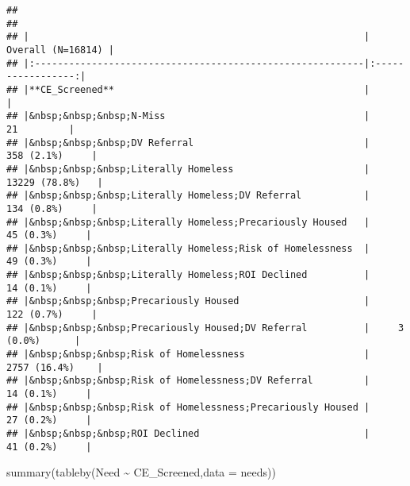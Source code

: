 \documentclass[
]{article}
\newenvironment{Shaded}{\begin{snugshade}}{\end{snugshade}}
\newcommand{\AttributeTok}[1]{\textcolor[rgb]{0.77,0.63,0.00}{#1}}
\newcommand{\FunctionTok}[1]{\textcolor[rgb]{0.00,0.00,0.00}{#1}}
\newcommand{\NormalTok}[1]{#1}
\newcommand{\SpecialCharTok}[1]{\textcolor[rgb]{0.00,0.00,0.00}{#1}}
\begin{document}
\begin{verbatim}
## 
## 
## |                                                           | Overall (N=16814) |
## |:----------------------------------------------------------|:-----------------:|
## |**CE_Screened**                                            |                   |
## |&nbsp;&nbsp;&nbsp;N-Miss                                   |        21         |
## |&nbsp;&nbsp;&nbsp;DV Referral                              |    358 (2.1%)     |
## |&nbsp;&nbsp;&nbsp;Literally Homeless                       |   13229 (78.8%)   |
## |&nbsp;&nbsp;&nbsp;Literally Homeless;DV Referral           |    134 (0.8%)     |
## |&nbsp;&nbsp;&nbsp;Literally Homeless;Precariously Housed   |     45 (0.3%)     |
## |&nbsp;&nbsp;&nbsp;Literally Homeless;Risk of Homelessness  |     49 (0.3%)     |
## |&nbsp;&nbsp;&nbsp;Literally Homeless;ROI Declined          |     14 (0.1%)     |
## |&nbsp;&nbsp;&nbsp;Precariously Housed                      |    122 (0.7%)     |
## |&nbsp;&nbsp;&nbsp;Precariously Housed;DV Referral          |     3 (0.0%)      |
## |&nbsp;&nbsp;&nbsp;Risk of Homelessness                     |   2757 (16.4%)    |
## |&nbsp;&nbsp;&nbsp;Risk of Homelessness;DV Referral         |     14 (0.1%)     |
## |&nbsp;&nbsp;&nbsp;Risk of Homelessness;Precariously Housed |     27 (0.2%)     |
## |&nbsp;&nbsp;&nbsp;ROI Declined                             |     41 (0.2%)     |
\end{verbatim}

\begin{Shaded}
\begin{Highlighting}[]
\FunctionTok{summary}\NormalTok{(}\FunctionTok{tableby}\NormalTok{(Need }\SpecialCharTok{\textasciitilde{}}\NormalTok{ CE\_Screened,}\AttributeTok{data =}\NormalTok{ needs))}
\end{Highlighting}
\end{Shaded}
\end{document}
